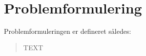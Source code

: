 \chapter{Problemformulering}
\label{cha:problemformulering}
Problemformuleringen er defineret således: 
\begin{quote}
  TEXT
\end{quote}
